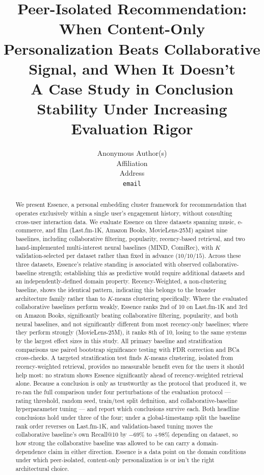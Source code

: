 \documentclass{article}
\title{Peer-Isolated Recommendation: When Content-Only Personalization Beats Collaborative Signal, and When It Doesn't\footnotemark\\[0.25em]
{\large A Case Study in Conclusion Stability Under Increasing Evaluation Rigor}}
\author{%
  Anonymous Author(s) \\
  Affiliation \\
  Address \\
  \texttt{email}
}
\begin{document}
\maketitle
\renewcommand{\thefootnote}{\fnsymbol{footnote}}%
%
\renewcommand{\thefootnote}{\arabic{footnote}}\setcounter{footnote}{0}

\begin{abstract}
We present Essence, a personal embedding cluster framework for recommendation that operates exclusively within a single user's engagement history, without consulting cross-user interaction data. We evaluate Essence on three datasets spanning music, e-commerce, and film (Last.fm-1K, Amazon Books, MovieLens-25M) against nine baselines, including collaborative filtering, popularity, recency-based retrieval, and two hand-implemented multi-interest neural baselines (MIND, ComiRec), with $K$ validation-selected per dataset rather than fixed in advance ($10$/$10$/$15$). Across these three datasets, Essence's relative standing is associated with observed collaborative-baseline strength; establishing this as predictive would require additional datasets and an independently-defined domain property. Recency-Weighted, a non-clustering baseline, shows the identical pattern, indicating this belongs to the broader architecture family rather than to $K$-means clustering specifically. Where the evaluated collaborative baselines perform weakly, Essence ranks 2nd of 10 on Last.fm-1K and 3rd on Amazon Books, significantly beating collaborative filtering, popularity, and both neural baselines, and not significantly different from most recency-only baselines; where they perform strongly (MovieLens-25M), it ranks 8th of 10, losing to the same systems by the largest effect sizes in this study. All primary baseline and stratification comparisons use paired bootstrap significance testing with FDR correction and BCa cross-checks. A targeted stratification test finds $K$-means clustering, isolated from recency-weighted retrieval, provides no measurable benefit even for the users it should help most: no stratum shows Essence significantly ahead of recency-weighted retrieval alone. Because a conclusion is only as trustworthy as the protocol that produced it, we re-ran the full comparison under four perturbations of the evaluation protocol --- rating threshold, random seed, train/test split definition, and collaborative-baseline hyperparameter tuning --- and report which conclusions survive each. Both headline conclusions hold under three of the four; under a global-timestamp split the baseline rank order reverses on Last.fm-1K, and validation-based tuning moves the collaborative baseline's own Recall@10 by $-69\%$ to $+98\%$ depending on dataset, so how strong the collaborative baseline was allowed to be can carry a domain-dependence claim in either direction. Essence is a data point on the domain conditions under which peer-isolated, content-only personalization is or isn't the right architectural choice.
\end{abstract}
\end{document}
